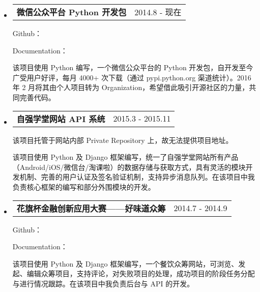 \documentclass[a4paper,9pt]{article}
\makeatletter
\newcommand{\ressubheading}[2]{
  \begin{tabular*}{172mm}{l@{\extracolsep{\fill}}r}
    \textbf{#1} & #2
  \end{tabular*}\vspace{0pt}}
\makeatother
\begin{document}
\begin{itemize}
\item

  \ressubheading{微信公众平台 Python 开发包}{2014.8 - 现在}

  \begin{adjustwidth}{8mm}{8mm}

  \textnormal{Github：\color{link}{https://github.com/wechat-python-sdk/} }

  \textnormal{Documentation：\color{link}{http://wechat-python-sdk.com/}}

  \textnormal{该项目使用 Python 编写，一个微信公众平台的 Python 开发包，自开发至今广受用户好评，每月 4000+ 次下载（通过 pypi.python.org 渠道统计）。2016 年 2 月将其由个人项目转为 Organization，希望借此吸引开源社区的力量，共同完善代码。}

  \end{adjustwidth}

\end{itemize}

\begin{itemize}
\item
  \ressubheading{自强学堂网站 API 系统}{2015.3 - 2015.11}

  \begin{adjustwidth}{8mm}{8mm}

  \textnormal{该项目托管于网站内部 Private Repository 上，故无法提供项目地址。}

  \textnormal{该项目使用 Python 及 Django 框架编写，统一了自强学堂网站所有产品（Android/iOS/微信台/淘课啦）的数据存储与获取方式，具有灵活的模块开发机制、完善的用户认证及签名验证机制，支持异步消息队列。在该项目中我负责核心框架的编写和部分外围模块的开发。}

  \end{adjustwidth}
\end{itemize}

\begin{itemize}
\item
  \ressubheading{花旗杯金融创新应用大赛——好味道众筹}{2014.7 - 2014.9}

  \begin{adjustwidth}{8mm}{8mm}

  \textnormal{Github：\color{link}{https://github.com/doraemonext/citi/}}

  \textnormal{Documentation：\color{link}{http://docs.citi.apiary.io/}}

  \textnormal{该项目使用 Python 及 Django 框架编写，一个餐饮众筹网站，可浏览、发起、编辑众筹项目，支持评论，对失败项目的处理，成功项目的阶段任务分配与进行情况跟踪。在该项目中我负责后台与 API 的开发。}

  \end{adjustwidth}
\end{itemize}
\end{document}
